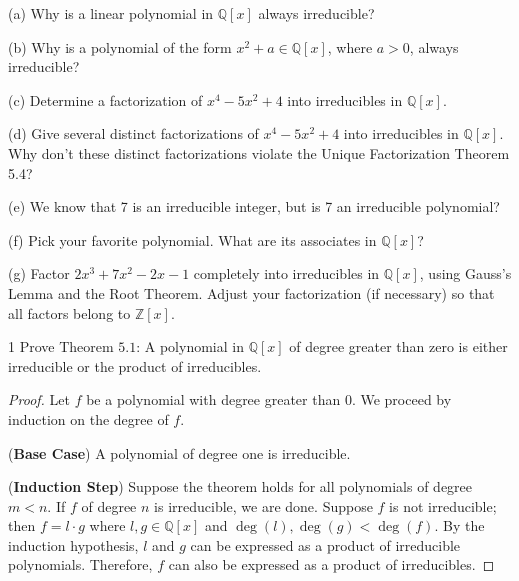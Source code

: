 \begin{problem}[Warmup]{(a)}
    Why is a linear polynomial in $\mathbb{Q}[x]$ always irreducible?
\end{problem}
\unsolved

\begin{problem}[Warmup]{(b)}
    Why is a polynomial of the form $x^2 + a \in \mathbb{Q}[x]$, where $a > 0$, always irreducible?
\end{problem}
\unsolved

\begin{problem}[Warmup]{(c)}
    Determine a factorization of $x^4 - 5x^2 + 4$ into irreducibles in $\mathbb{Q}[x]$.
\end{problem}
\unsolved

\begin{problem}[Warmup]{(d)}
    Give several distinct factorizations of $x^4 - 5x^2 + 4$ into irreducibles in $\mathbb{Q}[x]$. Why don't these distinct factorizations violate the Unique Factorization Theorem 5.4?
\end{problem}
\unsolved

\begin{problem}[Warmup]{(e)}
    We know that 7 is an irreducible integer, but is 7 an irreducible polynomial?
\end{problem}
\unsolved

\begin{problem}[Warmup]{(f)}
    Pick your favorite polynomial. What are its associates in $\mathbb{Q}[x]$?
\end{problem}
\unsolved

\begin{problem}[Warmup]{(g)}
    Factor $2x^3 + 7x^2 - 2x - 1$ completely into irreducibles in $\mathbb{Q}[x]$, using Gauss's Lemma and the Root Theorem. Adjust your factorization (if necessary) so that all factors belong to $\mathbb{Z}[x]$.
\end{problem}
\unsolved

\begin{problem}{1}
    Prove Theorem $5.1$: A polynomial in $\mathbb{Q}[x]$
    of degree greater than zero is either irreducible
    or the product of irreducibles.
\end{problem}
\solved

\begin{proof}
    Let $f$ be a polynomial with degree greater than $0$.
    We proceed by induction on the degree of $f$.

    (\textbf{Base Case}) A polynomial of degree one is irreducible.

    (\textbf{Induction Step}) 
    Suppose the theorem holds for all polynomials of degree $m < n$.
    If $f$ of degree $n$ is irreducible, we are done.
    Suppose $f$ is not irreducible; then $f = l \cdot g$ where $l, g \in \mathbb{Q}[x]$ 
    and $\deg(l), \deg(g) < \deg(f)$.
    By the induction hypothesis, $l$ and $g$ can be expressed as a product of irreducible polynomials.
    Therefore, $f$ can also be expressed as a product of irreducibles.
\end{proof}

